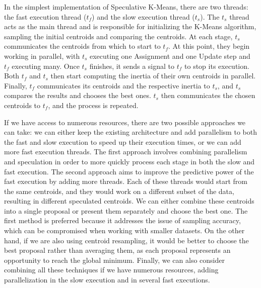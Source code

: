 In the simplest implementation of Speculative K-Means, there are two threads: the fast execution thread ($t_f$) and the slow execution thread ($t_s$). The $t_s$ thread acts as the main thread and is responsible for initializing the K-Means algorithm, sampling the initial centroids and comparing the centroids.
At each stage, $t_s$ communicates the centroids from which to start to $t_f$. At this point, they begin working in parallel, with $t_s$ executing one Assignment and one Update step and $t_f$ executing many. Once $t_s$ finishes, it sends a signal to $t_f$ to stop its execution. Both $t_f$ and $t_s$ then start computing the inertia of their own centroids in parallel. Finally, $t_f$ communicates its centroids and the respective inertia to $t_s$, and $t_s$ compares the results and chooses the best ones. $t_s$ then communicates the chosen centroids to $t_f$, and the process is repeated.

If we have access to numerous resources, there are two possible approaches we can take: we can either keep the existing architecture and add parallelism to both the fast and slow execution to speed up their execution times, or we can add more fast execution threads. The first approach involves combining parallelism and speculation in order to more quickly process each stage in both the slow and fast execution. The second approach aims to improve the predictive power of the fast execution by adding more threads. Each of these threads would start from the same centroids, and they would work on a different subset of the data, resulting in different speculated centroids. We can either combine these centroids into a single proposal or present them separately and choose the best one. The first method is preferred because it addresses the issue of sampling accuracy, which can be compromised when working with smaller datasets. On the other hand, if we are also using centroid resampling, it would be better to choose the best proposal rather than averaging them, as each proposal represents an opportunity to reach the global minimum. Finally, we can also consider combining all these techniques if we have numerous resources, adding parallelization in the slow execution and in several fast executions.